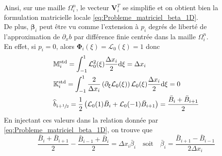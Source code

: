 \documentclass[11pt, a4paper, oneside]{report}
\begin{document}
Ainsi, sur une maille $\Omega_i^n$, le vecteur $\bm{V}_i^T$ se simplifie et on obtient bien la formulation matricielle locale \eqref{eq:Probleme_matriciel_beta_1D}. \\
De plus, $\bm{\beta}_i$ peut être vu comme l'extension à $p_i$ degrés de liberté de l'approximation de $\partial_x b$ par différence finie centrée dans la maille $\Omega_i^n$. \\
En effet, si $p_i = 0$, alors $\bm{\Phi}_i(\xi) = \mathcal{L}_0(\xi) = 1$ donc
\begin{equation}
    \begin{aligned}
        &\mathbb{M}_i^\text{std} = \int_{-1}^1 \mathcal{L}_0^2(\xi) \frac{\Delta x_i}{2} \text{d}\xi = \Delta x_i \\
        &\mathbb{K}_i^\text{std} = \int_{-1}^1 \frac{2}{\Delta x_i} \left( \partial_\xi \mathcal{L}_0(\xi) \right) \mathcal{L}_0(\xi) \frac{\Delta x_i}{2} \text{d}\xi = 0 \\
        &\widehat{b}_{i+\sfrac{1}{2}} = \frac{1}{2} \left( \mathcal{L}_0(1) \bar{B}_i + \mathcal{L}_0(-1) \bar{B}_{i+1} \right) = \frac{\bar{B}_i + \bar{B}_{i+1}}{2}
    \end{aligned}  
\end{equation}
En injectant ces valeurs dans la relation donnée par \eqref{eq:Probleme_matriciel_beta_1D}, on trouve que
\begin{equation}
    \frac{\bar{B}_i + \bar{B}_{i+1}}{2} - \frac{\bar{B}_{i-1} + \bar{B}_i}{2} = \Delta x_i \bar{\beta}_i \quad \text{soit} \quad \bar{\beta}_i = \frac{\bar{B}_{i+1} - \bar{B}_{i-1}}{2 \Delta x_i}
\end{equation}
\end{document}
